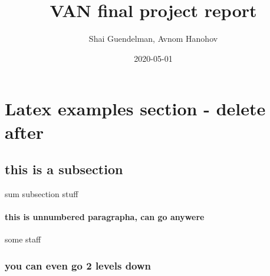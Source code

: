 \documentclass{article}
\title{VAN final project report}
\date{2020-05-01}
\author{Shai Guendelman, Avnom Hanohov}
\begin{document}
	\maketitle
	\newpage
	
	\section{Latex examples section - delete after}
	\subsection{this is a subsection}
	sum subsection stuff 
	
	\paragraph{this is unnumbered paragrapha, can go anywere}
	some staff
	\subsubsection{you can even go 2 levels down}
\end{document}
